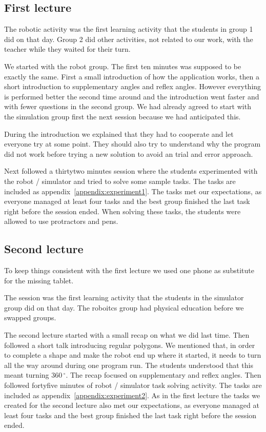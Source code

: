 \subsection{First lecture}
The robotic activity was the first learning activity that the students in group 1 did on that day. 
Group 2 did other activities, not related to our work, with the teacher  while they waited for their turn.

\bigskip\noindent
We started with the robot group. The first ten minutes was supposed to be exactly the same. First a small introduction of how the application works, then a short introduction to supplementary angles and reflex angles. However everything is performed better the second time around and the introduction went faster and with fewer questions in the second group. We had already agreed to start with the simulation group first the next session because we had anticipated this.

\bigskip\noindent
During the introduction we explained that they had to cooperate and let everyone try at some point. They should also try to understand why the program did not work before trying a new solution to avoid an trial and error approach.

\bigskip\noindent
Next followed a thirtytwo minutes session where the students experimented with the robot / simulator and tried to solve some sample tasks. The tasks are included as appendix~\ref{appendix:experiment1}.
The tasks met our expectations, as everyone managed at least four tasks and the best group finished the last task right before the session ended. When solving these tasks, the students were allowed to use protractors and pens. 

\subsection{Second lecture}
To keep things consistent with the first lecture we used one phone as substitute for the missing tablet.

\bigskip\noindent
The session was the first learning activity that the students in the simulator group did on that day. 
The roboitcs group had physical education before we swapped groups.

\bigskip\noindent
The second lecture started with a small recap on what we did last time. Then followed a short talk introducing regular polygons. We mentioned that, in order to complete a shape and make the robot end up where it started, it needs to turn all the way around during one program run. The students understood that this meant turning $360\,^{\circ}$. The recap focused on supplementary and reflex angles. Then followed fortyfive minutes of robot / simulator task solving activity. The tasks are included as appendix~\ref{appendix:experiment2}.
As in the first lecture the tasks we created for the second lecture also met our expectations, as everyone managed at least four tasks and the best group finished the last task right before the session ended. 